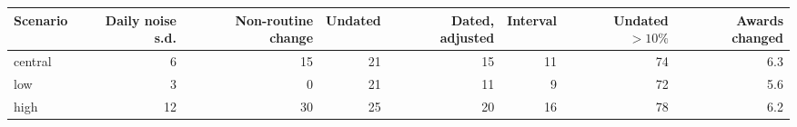 \begin{tabular}{lrrrrrrr}
\hline
Scenario & Daily noise s.d. & Non-routine change & Undated & Dated, adjusted & Interval & Undated $>10\%$ & Awards changed \\
\hline
central & 6 & 15 & 21 & 15 & 11 & 74 & 6.3 \\
low & 3 & 0 & 21 & 11 & 9 & 72 & 5.6 \\
high & 12 & 30 & 25 & 20 & 16 & 78 & 6.2 \\
\hline
\end{tabular}
